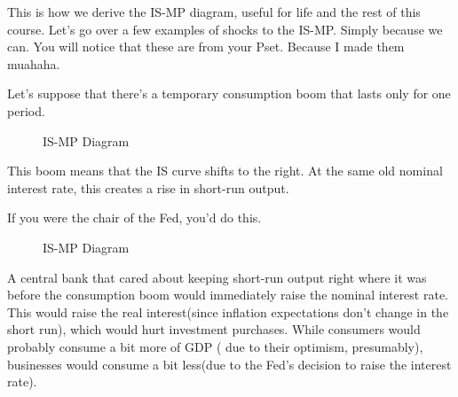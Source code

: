 \documentclass[11pt]{scrartcl}
\newcommand{\og}{\ensuremath{\tilde{Y}}}
\begin{document}
This is how we derive the IS-MP diagram, useful for life and the rest of this course. Let's go over a few examples of shocks to the IS-MP. Simply because we can. You will notice that these are from your Pset. Because I made them muahaha.

Let's suppose that there's a temporary consumption boom that lasts only for one period.

\begin{figure}[H]
\centering
{}
\caption{\color{blue}IS-\color{black}MP Diagram}
\end{figure}

This boom means that the IS curve shifts to the right. At the same old nominal interest
rate, this creates a rise in short-run output.

If you were the chair of the Fed, you'd do this.

\begin{figure}[H]
\centering
{}
\caption{\color{blue}IS-\color{black}MP Diagram}
\end{figure}

A central bank that cared about keeping short-run output right where it was before the consumption boom would immediately raise the nominal interest rate. This would raise the real interest(since inflation expectations don't change in the short run), which would hurt investment purchases. While consumers would probably consume a bit more of GDP ( due to their optimism, presumably), businesses would consume a bit less(due to the Fed's decision to raise the interest rate).
\end{document}
